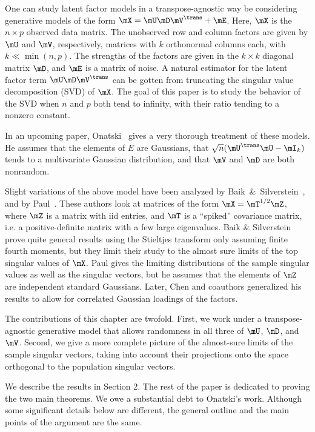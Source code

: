 One can study latent factor models in a transpose-agnostic way be considering
generative models of the form $\mX = \mU \mD \mV^\trans + \mE$. Here, $\mX$ is
the $n \times p$ observed data matrix. The unobserved row and column factors
are given by $\mU$ and $\mV$, respectively, matrices with $k$ orthonormal
columns each, with $k \ll \min(n,p)$. The strengths of the factors are given
in the $k\times k$ diagonal matrix $\mD$, and $\mE$ is a matrix of noise. A
natural estimator for the latent factor term $\mU \mD \mV^\trans$ can be
gotten from truncating the singular value decomposition (SVD)
\cite{golub1996mc} of $\mX$. The goal of this paper is to study the behavior
of the SVD when $n$ and $p$ both tend to infinity, with their ratio tending to
a nonzero constant.

In an upcoming paper, Onatski~\cite{onatski2009} gives a very thorough treatment
of these models. He assumes that the elements of $E$ are \iid Gaussians, that
$\sqrt{n} ( \mU^\trans \mU - \mI_k) $ tends to a multivariate Gaussian
distribution, and that $\mV$ and $\mD$ are both nonrandom.

Slight variations of the above model have been analyzed by
Baik~\&~Silverstein~\cite{baik2006els}, and by Paul~\cite{paul2007ase}. These
authors look at matrices of the form $\mX = \mT^{1/2} \mZ$, where $\mZ$ is a
matrix with iid entries, and $\mT$ is a ``spiked'' covariance matrix, i.e. a
positive-definite matrix with a few large eigenvalues. Baik \& Silverstein
prove quite general results using the Stieltjes transform only assuming finite
fourth moments, but they limit their study to the almost sure limits of the
top singular values of $\mX$. Paul gives the limiting distributions of the
sample singular values as well as the singular vectors, but he assumes that
the elements of $\mZ$ are independent standard Gaussians. Later, Chen and
coauthors \cite{chen2009ppc} generalized his results to allow for correlated
Gaussian loadings of the factors.

The contributions of this chapter are twofold. First, we work under a
transpose-agnostic generative model that allows randomness in all three of
$\mU$, $\mD$, and $\mV$. Second, we give a more complete picture of the
almost-sure limits of the sample singular vectors, taking into account their
projections onto the space orthogonal to the population singular vectors.

We describe the results in Section 2. The rest of the paper is dedicated to
proving the two main theorems. We owe a substantial debt to Onatski's work.
Although some significant details below are different, the general outline and
the main points of the argument are the same.

